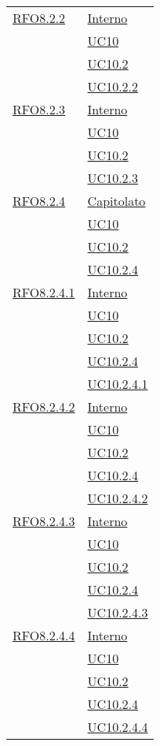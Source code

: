 \begin{longtable}{|>{\centering}m{5cm}|m{5cm}<{\centering}|}
  \hyperlink{RFO8.2.2}{RFO8.2.2} 
  & \hyperlink{Interno}{Interno}\\
  & \hyperref[UC10]{UC10}\\
  & \hyperref[UC10.2]{UC10.2}\\
  & \hyperref[UC10.2.2]{UC10.2.2}\\\hline
  
  \hyperlink{RFO8.2.3}{RFO8.2.3} 
  & \hyperlink{Interno}{Interno}\\
  & \hyperref[UC10]{UC10}\\
  & \hyperref[UC10.2]{UC10.2}\\
  & \hyperref[UC10.2.3]{UC10.2.3}\\\hline
  
  \hyperlink{RFO8.2.4}{RFO8.2.4} 
  & \hyperlink{Capitolato}{Capitolato}\\
  & \hyperref[UC10]{UC10}\\
  & \hyperref[UC10.2]{UC10.2}\\
  & \hyperref[UC10.2.4]{UC10.2.4}\\\hline
  
\hyperlink{RFO8.2.4.1}{RFO8.2.4.1} 
 & \hyperlink{Interno}{Interno}\\
 & \hyperref[UC10]{UC10}\\
 & \hyperref[UC10.2]{UC10.2}\\
 & \hyperref[UC10.2.4]{UC10.2.4}\\
 & \hyperref[UC10.2.4.1]{UC10.2.4.1}\\\hline
 
 \hyperlink{RFO8.2.4.2}{RFO8.2.4.2} 
 & \hyperlink{Interno}{Interno}\\
 & \hyperref[UC10]{UC10}\\
 & \hyperref[UC10.2]{UC10.2}\\
 & \hyperref[UC10.2.4]{UC10.2.4}\\
 & \hyperref[UC10.2.4.2]{UC10.2.4.2}\\\hline
 
 \hyperlink{RFO8.2.4.3}{RFO8.2.4.3} 
 & \hyperlink{Interno}{Interno}\\
 & \hyperref[UC10]{UC10}\\
 & \hyperref[UC10.2]{UC10.2}\\
 & \hyperref[UC10.2.4]{UC10.2.4}\\
 & \hyperref[UC10.2.4.3]{UC10.2.4.3}\\\hline
 
 \hyperlink{RFO8.2.4.4}{RFO8.2.4.4} 
 & \hyperlink{Interno}{Interno}\\
 & \hyperref[UC10]{UC10}\\
 & \hyperref[UC10.2]{UC10.2}\\
 & \hyperref[UC10.2.4]{UC10.2.4}\\
 & \hyperref[UC10.2.4.4]{UC10.2.4.4}\\\hline
 

\end{longtable}
